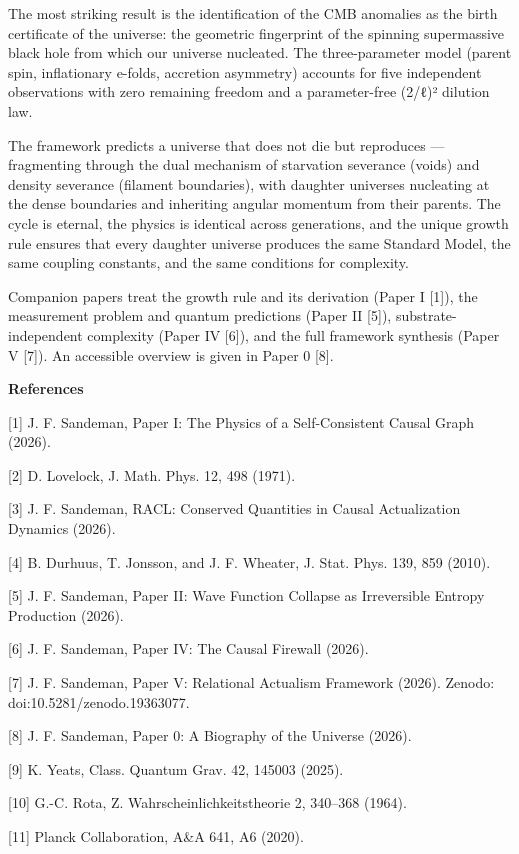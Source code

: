 \documentclass[12pt,a4paper]{article}
\begin{document}
The most striking result is the identification of the CMB anomalies as
the birth certificate of the universe: the geometric fingerprint of the
spinning supermassive black hole from which our universe nucleated. The
three-parameter model (parent spin, inflationary e-folds, accretion
asymmetry) accounts for five independent observations with zero
remaining freedom and a parameter-free (2/ℓ)² dilution law.

The framework predicts a universe that does not die but reproduces ---
fragmenting through the dual mechanism of starvation severance (voids)
and density severance (filament boundaries), with daughter universes
nucleating at the dense boundaries and inheriting angular momentum from
their parents. The cycle is eternal, the physics is identical across
generations, and the unique growth rule ensures that every daughter
universe produces the same Standard Model, the same coupling constants,
and the same conditions for complexity.

Companion papers treat the growth rule and its derivation (Paper I
{[}1{]}), the measurement problem and quantum predictions (Paper II
{[}5{]}), substrate-independent complexity (Paper IV {[}6{]}), and the
full framework synthesis (Paper V {[}7{]}). An accessible overview is
given in Paper 0 {[}8{]}.

\textbf{References}

{[}1{]} J. F. Sandeman, Paper I: The Physics of a Self-Consistent Causal
Graph (2026).

{[}2{]} D. Lovelock, J. Math. Phys. 12, 498 (1971).

{[}3{]} J. F. Sandeman, RACL: Conserved Quantities in Causal
Actualization Dynamics (2026).

{[}4{]} B. Durhuus, T. Jonsson, and J. F. Wheater, J. Stat. Phys. 139,
859 (2010).

{[}5{]} J. F. Sandeman, Paper II: Wave Function Collapse as Irreversible
Entropy Production (2026).

{[}6{]} J. F. Sandeman, Paper IV: The Causal Firewall (2026).

{[}7{]} J. F. Sandeman, Paper V: Relational Actualism Framework (2026).
Zenodo: doi:10.5281/zenodo.19363077.

{[}8{]} J. F. Sandeman, Paper 0: A Biography of the Universe (2026).

{[}9{]} K. Yeats, Class. Quantum Grav. 42, 145003 (2025).

{[}10{]} G.-C. Rota, Z. Wahrscheinlichkeitstheorie 2, 340--368 (1964).

{[}11{]} Planck Collaboration, A\&A 641, A6 (2020).
\end{document}
